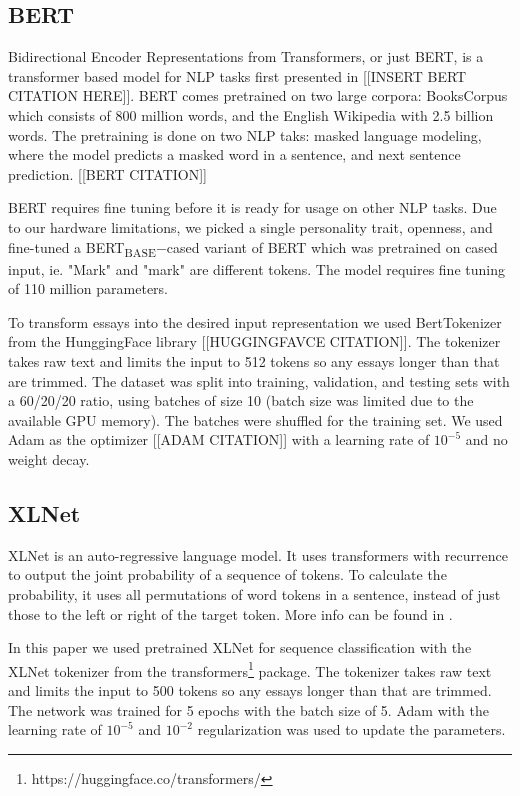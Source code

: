 \documentclass[10pt, a4paper]{article}
\begin{document}
\subsection{BERT}

Bidirectional Encoder Representations from Transformers, or just BERT, is a transformer based model for NLP tasks first presented in [[INSERT BERT CITATION HERE]]. 
BERT comes pretrained on two large corpora: BooksCorpus which consists of 800 million words, and the English Wikipedia with 2.5 billion words. 
The pretraining is done on two NLP taks: masked language modeling, where the model predicts a masked word in a sentence, and next sentence prediction. [[BERT CITATION]]

BERT requires fine tuning before it is ready for usage on other NLP tasks. 
Due to our hardware limitations, we picked a single personality trait, openness, and fine-tuned a BERT\textsubscript{BASE}$-$cased variant of BERT which was pretrained on cased input, ie. "Mark" and "mark" are different tokens. 
The model requires fine tuning of 110 million parameters.

To transform essays into the desired input representation we used BertTokenizer from the HunggingFace library [[HUGGINGFAVCE CITATION]]. 
The tokenizer takes raw text and limits the input to 512 tokens so any essays longer than that are trimmed. 
The dataset was split into training, validation, and testing sets with a 60/20/20 ratio, using batches of size 10 (batch size was limited due to the available GPU memory). 
The batches were shuffled for the training set. We used Adam as the optimizer [[ADAM CITATION]] with a learning rate of $10^{-5}$ and no weight decay.

\subsection{XLNet}

XLNet is an auto-regressive language model.
It uses transformers with recurrence to output the joint probability of a sequence of tokens.
To calculate the probability, it uses all permutations of word tokens in a sentence, instead of just those to the left or right of the target token.
More info can be found in \citep{DBLP:journals/corr/abs-1906-08237}.

In this paper we used pretrained XLNet for sequence classification with the XLNet tokenizer from the transformers\footnote{https://huggingface.co/transformers/} package.
The tokenizer takes raw text and limits the input to 500 tokens so any essays longer than that are trimmed.
The network was trained for 5 epochs with the batch size of 5.
Adam with the learning rate of $10^{-5}$ and $10^{-2}$ regularization was used to update the parameters.
\end{document}
